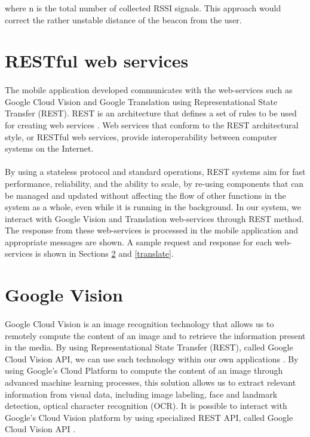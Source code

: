 \documentclass[12pt]{article}
\begin{document}
where n is the total number of collected RSSI signals. This approach would correct the rather unstable distance of the beacon from the user. 


\section{RESTful web services}
\paragraph{} The mobile application developed communicates with the web-services such as Google Cloud Vision and Google Translation using Representational State Transfer (REST).  REST is an 
architecture that defines a set of rules to be used for creating web services \cite{rest}. Web services that conform to the REST architectural style, or RESTful web services, provide interoperability between computer systems on the Internet.

\paragraph{}By using a stateless protocol and standard operations, REST systems aim for fast performance, reliability, and the ability to scale, by re-using components that can be managed and updated without affecting the flow of other functions in the system as a whole, even while it is running in the background. In our system, we interact with Google Vision and Translation web-services through REST method. The response from these web-services is processed in the mobile application and appropriate messages are shown. A sample request and response for each web-services is shown in Sections \ref{vision} and \ref{translate}.

\section{Google Vision}
\label{vision}
\paragraph{}Google Cloud Vision is an image recognition technology that allows us to remotely compute the content of an image and to retrieve the information present in the media. By using Representational State Transfer (REST), called Google Cloud Vision API, we can use such technology within our own applications \cite{vision}. By using Google’s Cloud Platform to compute the content of an image through advanced machine learning processes, this solution allows us to extract relevant information from visual data, including image labeling, face and landmark detection, optical character recognition (OCR). It is possible to interact with Google’s Cloud Vision platform by using specialized REST API, called Google Cloud Vision API \cite{vision}.
\end{document}
